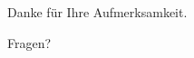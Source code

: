 \documentclass[ignorenonframetext]{beamer}
\newcommand{\mybreak}{\par\vspace*{\baselineskip}}
\begin{document}
	
%
\begin{frame}
\begin{center}
	Danke für Ihre Aufmerksamkeit.\mybreak
	Fragen?
\end{center}	
\end{frame}
\end{document}
